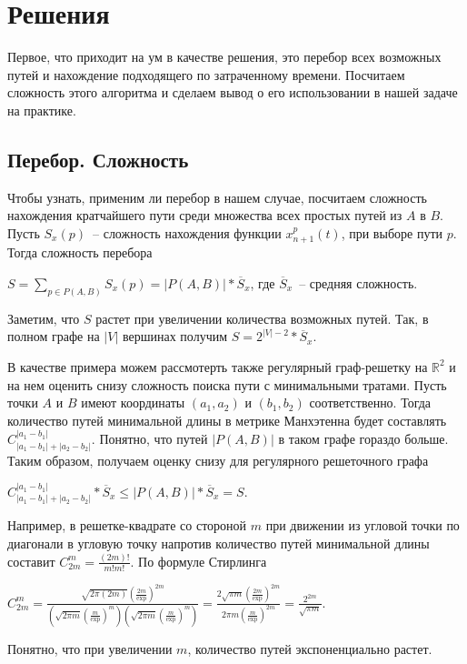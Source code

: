 \documentclass[12pt, a4paper]{article}
\begin{document}
\section{Решения}

Первое, что приходит на ум в качестве решения, это перебор всех возможных путей и нахождение подходящего по затраченному времени. Посчитаем сложность этого алгоритма и сделаем вывод о его использовании в нашей задаче на практике.

\subsection{Перебор. Сложность}
Чтобы узнать, применим ли перебор в нашем случае, посчитаем сложность нахождения кратчайшего пути среди множества всех простых путей из $A$ в $B$. Пусть $S_x(p)$~-- сложность нахождения функции $x^p_{n+1}(t)$, при выборе пути $p$. Тогда сложность перебора
\begin{center}
 $S = \sum\limits_{p \in P(A,B)} S_x(p) = \vert P(A,B) \vert * \overline S_x$, где $\overline S_x$~-- средняя сложность.
\end{center}
Заметим, что $ S $ растет при увеличении количества возможных путей. Так, в полном графе на $\vert V \vert$ вершинах получим $S = 2^{|V|-2} * \overline S_x$.

В качестве примера можем рассмотерть также регулярный граф-решетку на $\mathbb {R}^2$ и на нем оценить снизу сложность поиска пути с минимальными тратами. Пусть точки $A$ и $B$ имеют координаты $(a_1, a_2)$ и $(b_1, b_2)$ соответственно. Тогда количество путей минимальной длины в метрике Манхэтенна будет составлять $C^{|a_1-b_1|}_{|a_1-b_1| + |a_2-b_2|}$. Понятно, что путей $|P(A,B)|$ в таком графе гораздо больше. Таким образом, получаем оценку снизу для регулярного решеточного графа

\begin{center}
	$C^{|a_1-b_1|}_{|a_1-b_1| + |a_2-b_2|} * \overline S_x  \leq  \vert P(A,B) \vert * \overline S_x = S$.
\end{center}

Например, в решетке-квадрате со стороной $m$ при движении из угловой точки по диагонали в угловую точку напротив количество путей минимальной длины составит $C^m_{2m} = \frac{(2m)!}{m!m!} $. По формуле Стирлинга
\begin{center}
 $ C^m_{2m} = \frac{\sqrt{2\pi(2m)} \left( \frac{2m}{\exp} \right)^{2m}}{\left(\sqrt{2\pi m} \left( \frac{m}{\exp} \right)^m \right)  \left(\sqrt{2\pi m} \left( \frac{m}{\exp} \right)^m \right)} = \frac{2\sqrt{\pi m} \left( \frac{2m}{\exp} \right)^{2m}}{2\pi m \left( \frac{m}{\exp} \right)^{2m}} = \frac{2^{2m}}{\sqrt{\pi m}}$.
\end{center}
Понятно, что при увеличении $m$, количество путей экспоненциально растет.
\end{document}
